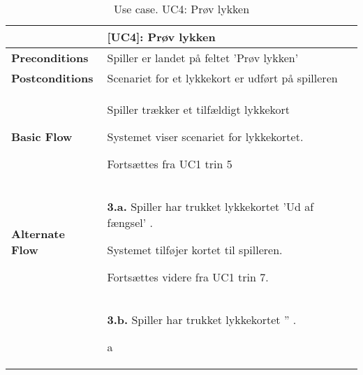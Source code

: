 \documentclass[class=article, crop=false]{standalone}
\begin{document}
    \begin{table}[H]
        \caption{Use case. UC4: Prøv lykken}
        \begin{tabularx}{\textwidth}{|l|X|}
            \hline
            & \textbf{[UC4]: Prøv lykken}   \\ \hline
            \textbf{Preconditions}       & Spiller er landet på feltet 'Prøv lykken'\\ \hline
            \textbf{Postconditions}      & Scenariet for et lykkekort er udført på spilleren\\ \hline


            \textbf{Basic Flow} & \begin{tabenum}
                                      \item Spiller trækker et tilfældigt lykkekort
                                      \item Systemet viser scenariet for lykkekortet.
                                      \item Fortsættes fra UC1 trin 5
            \end{tabenum}   \\ \hline




            \textbf{Alternate Flow}   & \textbf{3.a.} Spiller har trukket lykkekortet 'Ud af fængsel' .
            \begin{enumerate} \begin{tabenum}
                                  \item Systemet tilføjer kortet til spilleren.
                                  \item Fortsættes videre fra UC1 trin 7.
            \end{tabenum} \end{enumerate}
            \\




                               & \textbf{3.b.} Spiller har trukket lykkekortet '' .
            \begin{enumerate} \begin{tabenum}
                                  \item a
            \end{tabenum} \end{enumerate}
            \\




            \hline

        \end{tabularx}


    \end{table}
\end{document}
